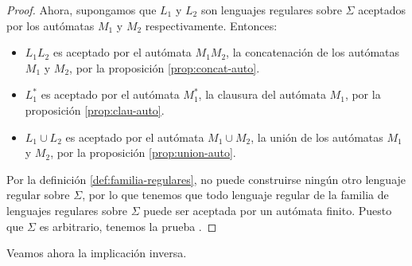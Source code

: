 \begin{proof}
Ahora, supongamos que $L_1$ y $L_2$ son lenguajes regulares sobre $\Sigma$ aceptados por los autómatas $M_1$ y $M_2$ respectivamente.
Entonces:
\begin{itemize}
    \item $L_1L_2$ es aceptado por el autómata $M_1M_2$, la concatenación de los autómatas $M_1$ y $M_2$, por 
    la proposición \ref{prop:concat-auto}.
    \item $L_1^*$ es aceptado por el autómata $M_1^*$, la clausura del autómata $M_1$, por la proposición
    \ref{prop:clau-auto}.
    \item $L_1\cup L_2$ es aceptado por el autómata $M_1\cup M_2$, la unión de los autómatas $M_1$ y $M_2$, por 
    la proposición \ref{prop:union-auto}.
\end{itemize}
Por la definición \ref{def:familia-regulares}, no puede construirse ningún otro lenguaje regular sobre $\Sigma$, por
lo que tenemos que todo lenguaje regular de la familia de lenguajes regulares sobre $\Sigma$ puede ser aceptada por un
autómata finito. Puesto que $\Sigma$ es arbitrario, tenemos la prueba \cite{kleene_teo}.
\end{proof}

Veamos ahora la implicación inversa.

